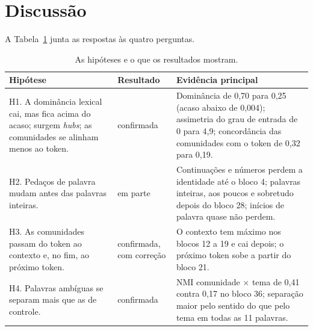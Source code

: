 \section{Discussão}\label{sec:discussao}

A Tabela~\ref{tab:respostas} junta as respostas às quatro perguntas.

\begin{table}[htbp]
\centering
\caption{As hipóteses e o que os resultados mostram.}\label{tab:respostas}
\small
\begin{tabularx}{\linewidth}{@{}>{\raggedright\arraybackslash}p{5.6cm} l X@{}}
\toprule
\textbf{Hipótese} & \textbf{Resultado} & \textbf{Evidência principal} \\
\midrule
H1. A dominância lexical cai, mas fica acima do acaso; surgem \emph{hubs}; as comunidades se
alinham menos ao token. & confirmada &
Dominância de 0,70 para 0,25 (acaso abaixo de 0,004); assimetria do grau de entrada de 0 para
4,9; concordância das comunidades com o token de 0,32 para 0,19. \\
\midrule
H2. Pedaços de palavra mudam antes das palavras inteiras. & em parte &
Continuações e números perdem a identidade até o bloco 4; palavras inteiras, aos poucos e
sobretudo depois do bloco 28; inícios de palavra quase não perdem. \\
\midrule
H3. As comunidades passam do token ao contexto e, no fim, ao próximo token. & confirmada, com
correção & O contexto tem máximo nos blocos 12 a 19 e cai depois; o próximo token sobe a partir
do bloco 21. \\
\midrule
H4. Palavras ambíguas se separam mais que as de controle. & confirmada &
NMI comunidade $\times$ tema de 0,41 contra 0,17 no bloco 36; separação maior pelo sentido do
que pelo tema em todas as 11 palavras. \\
\bottomrule
\end{tabularx}
\end{table}

